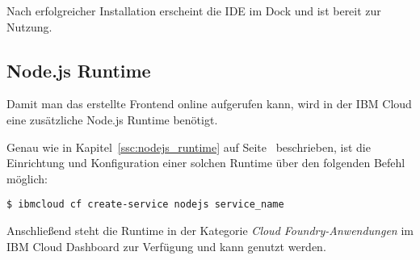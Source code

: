 Nach erfolgreicher Installation erscheint die IDE im Dock und ist bereit zur Nutzung.

\subsection{Node.js Runtime}
Damit man das erstellte Frontend online aufgerufen kann, wird in der IBM Cloud eine zusätzliche Node.js Runtime
benötigt.

Genau wie in Kapitel~\ref{ssc:nodejs_runtime} auf Seite~\pageref{ssc:nodejs_runtime} beschrieben, ist die Einrichtung
und Konfiguration einer solchen Runtime über den folgenden Befehl möglich:

\begin{lstlisting}[caption=Instanziierung der Node.js Runtime, label=ls:vorbereitung_nodejsdashboard]
    $ ibmcloud cf create-service nodejs service_name
\end{lstlisting}

Anschließend steht die Runtime in der Kategorie \textit{Cloud Foundry-Anwendungen} im IBM Cloud Dashboard zur Verfügung
und kann genutzt werden.